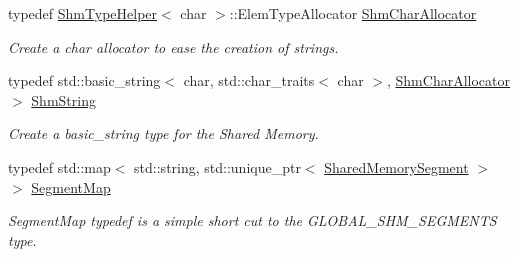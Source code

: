 \begin{DoxyCompactItemize}
\mbox{\label{namespaceshared__memory_a36a105df63154c883e86f4282f380647}} 
typedef \hyperlink{structshared__memory_1_1ShmTypeHelper}{Shm\+Type\+Helper}$<$ char $>$\+::Elem\+Type\+Allocator \hyperlink{namespaceshared__memory_a36a105df63154c883e86f4282f380647}{Shm\+Char\+Allocator}
\begin{DoxyCompactList}\small\item\em Create a char allocator to ease the creation of strings. \end{DoxyCompactList}\item 
\mbox{\label{namespaceshared__memory_a07ee51d077030d33ba8408f5938569cc}} 
typedef std\+::basic\+\_\+string$<$ char, std\+::char\+\_\+traits$<$ char $>$, \hyperlink{namespaceshared__memory_a36a105df63154c883e86f4282f380647}{Shm\+Char\+Allocator} $>$ \hyperlink{namespaceshared__memory_a07ee51d077030d33ba8408f5938569cc}{Shm\+String}
\begin{DoxyCompactList}\small\item\em Create a basic\+\_\+string type for the Shared Memory. \end{DoxyCompactList}\item 
\mbox{\label{namespaceshared__memory_a9aeebdfb6185497cac7c093cf3d765c5}} 
typedef std\+::map$<$ std\+::string, std\+::unique\+\_\+ptr$<$ \hyperlink{classshared__memory_1_1SharedMemorySegment}{Shared\+Memory\+Segment} $>$ $>$ \hyperlink{namespaceshared__memory_a9aeebdfb6185497cac7c093cf3d765c5}{Segment\+Map}
\begin{DoxyCompactList}\small\item\em Segment\+Map typedef is a simple short cut to the G\+L\+O\+B\+A\+L\+\_\+\+S\+H\+M\+\_\+\+S\+E\+G\+M\+E\+N\+TS type. \end{DoxyCompactList}\end{DoxyCompactItemize}
